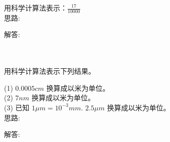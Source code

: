 \item {
    用科学计算法表示：$ \frac{17}{10000} $
    \ifshowSolution
        \fangsong{}
        \\
        思路:

        解答: 
    \else
        \\ \\ \\
    \fi
}

\item {
    用科学计算法表示下列结果。
    
    (1) $ 0.0005 cm$ 换算成以米为单位。\\
    (2) $ 7 nm $ 换算成以米为单位。\\
    (3) 已知 $1 \mu m = 10^{-3}mm$. $ 2.5 \mu m$ 换算成以米为单位。
    \ifshowSolution
        \fangsong{}
        \\
        思路:

        解答: 
    \else
        \\ \\ \\
    \fi
}